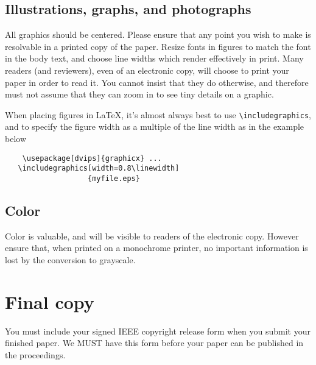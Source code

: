 \documentclass[10pt,twocolumn,letterpaper]{article}
\begin{document}
\subsection{Illustrations, graphs, and photographs}

All graphics should be centered.  Please ensure that any point you
wish to make is resolvable in a printed copy of the paper.  Resize
fonts in figures to match the font in the body text, and choose line
widths which render effectively in print.  Many readers (and
reviewers), even of an electronic copy, will choose to print your
paper in order to read it.  You cannot insist that they do otherwise,
and therefore must not assume that they can zoom in to see tiny
details on a graphic.

When placing figures in \LaTeX, it's almost always best to use
\verb+\includegraphics+, and to specify the figure width as a multiple
of the line width as in the example below {\small\begin{verbatim}
    \usepackage[dvips]{graphicx} ...
   \includegraphics[width=0.8\linewidth]
                   {myfile.eps}
\end{verbatim}
}


\subsection{Color}

Color is valuable, and will be visible to readers of the electronic
copy.  However ensure that, when printed on a monochrome printer, no
important information is lost by the conversion to grayscale.

\section{Final copy}

You must include your signed IEEE copyright release form when you
submit your finished paper. We MUST have this form before your paper
can be published in the proceedings.


{\small   }
\end{document}
